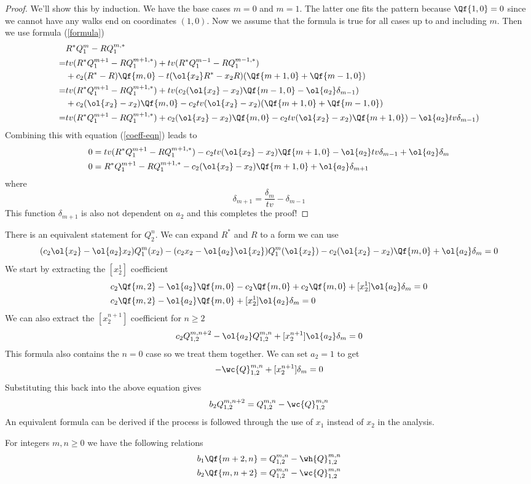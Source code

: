 \begin{proof}We'll show this by induction. We have the base cases $m = 0$ and $m=1$. The latter one fits the pattern because $\Qf{1,0} = 0$ since we cannot have any walks end on coordinates $(1,0)$. Now we assume that the formula is true for all cases up to and including $m$. Then we use formula (\ref{formula})
\begin{align*}
& R^\ast Q_1^m -R Q_1^{m,\ast}\\
=&tv(R^\ast Q_1^{m+1}-R Q_1^{m+1,\ast}) + tv(R^\ast Q_1^{m-1}-R Q_1^{m-1,\ast})\\
& + c_2(R^\ast-R)\Qf{m,0}-t(\ol{x_2}R^\ast-x_2 R)(\Qf{m+1,0}+\Qf{m-1,0})\\
=& tv(R^\ast Q_1^{m+1}-R Q_1^{m+1,\ast}) + tv(c_2(\ol{x_2}-x_2)\Qf{m-1,0}-\ol{a_2}\delta_{m-1})\\
& + c_2(\ol{x_2}-x_2)\Qf{m,0}-c_2tv(\ol{x_2}-x_2)(\Qf{m+1,0}+\Qf{m-1,0})\\
=& tv(R^\ast Q_1^{m+1}-R Q_1^{m+1,\ast})+ c_2(\ol{x_2}-x_2)\Qf{m,0}-c_2tv(\ol{x_2}-x_2)\Qf{m+1,0}) - \ol{a_2}tv\delta_{m-1})\\
\end{align*}
Combining this with equation (\ref{coeff-eqn}) leads to
\begin{align*}
0 &= tv(R^\ast Q_1^{m+1}-R Q_1^{m+1,\ast})-c_2tv(\ol{x_2}-x_2)\Qf{m+1,0} - \ol{a_2}tv\delta_{m-1} +\ol{a_2}\delta_m \\
 0 & = R^\ast Q_1^{m+1}-R Q_1^{m+1,\ast}-c_2(\ol{x_2}-x_2)\Qf{m+1,0}+ \ol{a_2}\delta_{m+1}
\end{align*}
where
\[
  \delta_{m+1} =\frac{\delta_m}{tv}-\delta_{m-1}
\]
This function $\delta_{m+1}$ is also not dependent on $a_2$ and this completes the proof!
\end{proof}
There is an equivalent statement for $Q_2^n$. We can expand $R^\ast$ and $R$ to a form we can use
\[
(c_2\ol{x_2}-\ol{a_2}x_2)Q_1^m(x_2) -( c_2x_2-\ol{a_2}\ol{x_2})Q_1^m(\ol{x_2}) - c_2(\ol{x_2}-x_2)\Qf{m,0} +\ol{a_2}\delta_m = 0
\]
We start by extracting the $[x_2^1]$ coefficient
\begin{align*}
& c_2\Qf{m,2}-\ol{a_2}\Qf{m,0}-c_2\Qf{m,0} +c_2\Qf{m,0}+ [x_2^1]\ol{a_2}\delta_m = 0\\
& c_2\Qf{m,2}-\ol{a_2}\Qf{m,0}+ [x_2^1]\ol{a_2}\delta_m = 0
\end{align*}
We can also extract the $[x_2^{n+1}]$ coefficient for $n\geq 2$
\[
  c_2 Q_{1,2}^{m,n+2}-\ol{a_2}Q_{1,2}^{m,n}+[x_2^{n+1}]\ol{a_2}\delta_m= 0
\]
This formula also contains the $n = 0$ case so we treat them together. We can set $a_2 = 1$ to get
\[
    -\wc{Q}_{1,2}^{m,n}+[x_2^{n+1}]\delta_m = 0
\]
Substituting this back into the above equation gives
\[
     b_2 Q_{1,2}^{m,n+2} = Q_{1,2}^{m,n} - \wc{Q}_{1,2}^{m,n}
\]
An equivalent formula can be derived if the process is followed through the use of $x_1$ instead of $x_2$ in the analysis.
\begin{corollary} For integers $m,n \ge 0$ we have the following relations
\begin{align*}
b_1 \Qf{m+2,n} &= Q_{1,2}^{m,n}-\wh{Q}_{1,2}^{m,n}\\
b_2 \Qf{m,n+2} &= Q_{1,2}^{m,n}-\wc{Q}_{1,2}^{m,n}
\end{align*}
\end{corollary}

